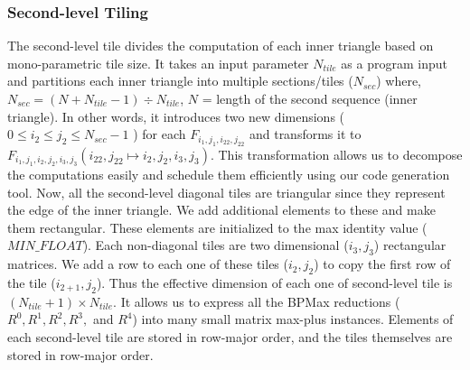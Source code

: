 \subsubsection{Second-level Tiling}
The second-level tile divides the computation of each inner triangle based on mono-parametric tile size. It takes an input parameter $N_{tile}$ as a program input and partitions each inner triangle into multiple sections/tiles ($N_{sec}$) where, $N_{sec} =(N+N_{tile}-1) \div N_{tile}$,  $N$  = length of the second sequence (inner triangle). In other words, it introduces two new dimensions ($0 \le i_{2} \le j_{2} \le N_{sec}-1$ ) for each $F_{i_{1}, j_{1}, i_{22}, j_{22}}$ and transforms it to $F_{i_{1}, j_{1}, i_{2}, j_{2}, i_{3}, j_{3}} (i_{22}, j_{22} \mapsto i_{2}, j_{2}, i_{3}, j_{3})$. This transformation allows us to decompose the computations easily and schedule them efficiently using our code generation tool. Now, all the second-level diagonal tiles are triangular since they represent the edge of the inner triangle. We add additional elements to these and make them rectangular. These elements are initialized to the max identity value ($MIN\_FLOAT$). Each non-diagonal tiles are two dimensional ($i_{3}, j_{3}$) rectangular matrices. We add a row to each one of these tiles ($i_{2}, j_{2}$) to copy the first row of the tile ($i_{2+1}, j_{2}$). Thus the effective dimension of each one of second-level tile is $(N_{tile} +1) \times  N_{tile}$. It allows us to express all the BPMax reductions ($R^{0}, R^{1}, R^{2}, R^{3},$ and $R^{4}$) into many small matrix max-plus instances. Elements of each second-level tile are stored in row-major order, and the tiles themselves are stored in row-major order.

